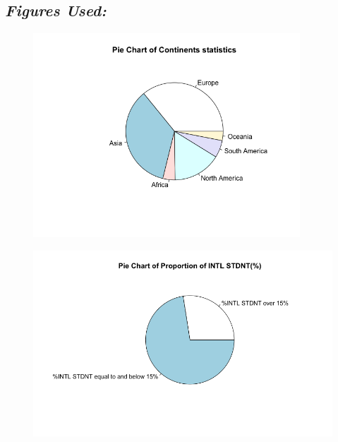 \documentclass{article}
\begin{document}
\subsection{\textbf{\textit{Figures Used:}}}

\begin{figure}
\centering
\begin{minipage}{.5\textwidth}
  \centering
  \includegraphics[width= 10cm]{Continent pie.png}
  \label{fig:test1}
\end{minipage}%
\begin{minipage}{.5\textwidth}
  \centering
  \includegraphics[width=12cm]{binary pie.png}
  \label{fig:test2}
\end{minipage}
\end{figure}
\end{document}
